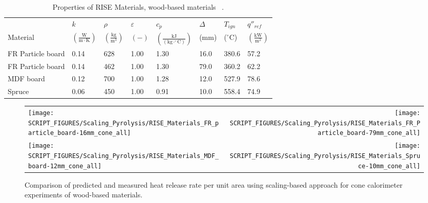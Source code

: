 \clearpage

\begin{table}[!h]
\caption[Properties of RISE Materials, wood-based materials]{Properties of RISE Materials, wood-based materials ~\cite{RISE:Fire_Database}.}
\centering
\begin{tabular}{|p{5.5cm}|p{1.0cm}|p{1.0cm}|p{0.8cm}|p{1.4cm}|p{1.0cm}|p{1.0cm}|p{1.2cm}|}
\hline
                                               & $k$    & $\rho$      & $\varepsilon$   & $c_{p}$ & $\Delta$    & $T_{ign}$ & $q''_{ref}$ \\
Material                                       & $\mathrm{\left(\frac{W}{m\cdot K}\right)}$ & $\mathrm{\left(\frac{kg}{m^{3}}\right)}$ & $\mathrm{( - )}$ & $\mathrm{\left(\frac{kJ}{(kg\cdot ^{\circ}C)}\right)}$ &  ($\mathrm{mm}$)   & ($\mathrm{^{\circ}C}$) & $\mathrm{\left(\frac{kW}{m^{2}}\right)}$ \\ \hline
\hline
FR Particle board & 0.14 & 628 & 1.00 & 1.30 & 16.0 & 380.6 & 57.2 \\ \hline 
FR Particle board & 0.14 & 462 & 1.00 & 1.30 & 79.0 & 360.2 & 62.2 \\ \hline 
MDF board & 0.12 & 700 & 1.00 & 1.28 & 12.0 & 527.9 & 78.6 \\ \hline 
Spruce & 0.06 & 450 & 1.00 & 0.91 & 10.0 & 558.4 & 74.9 \\ \hline 
\end{tabular}
\label{Properties_RISE_Materials_woods}
\end{table}

\begin{figure}[!h]
\begin{tabular*}{\textwidth}{l@{\extracolsep{\fill}}r}
\texttt{[image: SCRIPT\_FIGURES/Scaling\_Pyrolysis/RISE\_Materials\_FR\_particle\_board-16mm\_cone\_all]} &
\texttt{[image: SCRIPT\_FIGURES/Scaling\_Pyrolysis/RISE\_Materials\_FR\_Particle\_board-79mm\_cone\_all]} \\
\texttt{[image: SCRIPT\_FIGURES/Scaling\_Pyrolysis/RISE\_Materials\_MDF\_board-12mm\_cone\_all]} &
\texttt{[image: SCRIPT\_FIGURES/Scaling\_Pyrolysis/RISE\_Materials\_Spruce-10mm\_cone\_all]} \\
\end{tabular*}
\caption[Heat release rate per unit area of RISE materials using scaling model, wood-based materials]
{Comparison of predicted and measured heat release rate per unit area using scaling-based approach for cone calorimeter experiments of wood-based materials.}
\label{RISE_Materials_woods1}
\end{figure}

